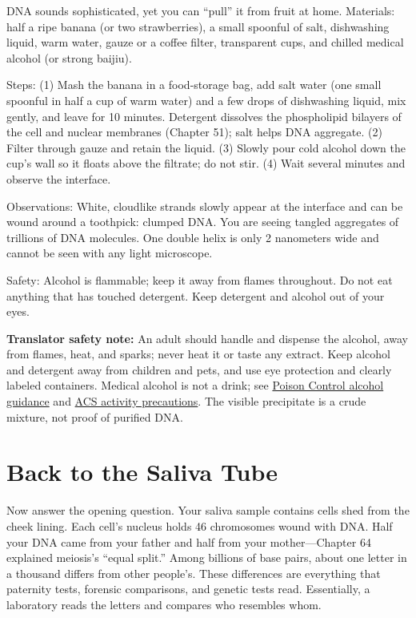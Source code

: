 \begin{shiyan}
DNA sounds sophisticated, yet you can ``pull'' it from fruit at home. Materials: half a ripe banana (or two strawberries), a small spoonful of salt, dishwashing liquid, warm water, gauze or a coffee filter, transparent cups, and chilled medical alcohol (or strong baijiu).

Steps: (1) Mash the banana in a food-storage bag, add salt water (one small spoonful in half a cup of warm water) and a few drops of dishwashing liquid, mix gently, and leave for 10 minutes. Detergent dissolves the phospholipid bilayers of the cell and nuclear membranes (Chapter 51); salt helps DNA aggregate. (2) Filter through gauze and retain the liquid. (3) Slowly pour cold alcohol down the cup's wall so it floats above the filtrate; do not stir. (4) Wait several minutes and observe the interface.

Observations: White, cloudlike strands slowly appear at the interface and can be wound around a toothpick: clumped DNA. You are seeing tangled aggregates of trillions of DNA molecules. One double helix is only 2 nanometers wide and cannot be seen with any light microscope.

Safety: Alcohol is flammable; keep it away from flames throughout. Do not eat anything that has touched detergent. Keep detergent and alcohol out of your eyes.
\end{shiyan}

\textbf{Translator safety note:} An adult should handle and dispense the alcohol, away from flames, heat, and sparks; never heat it or taste any extract. Keep alcohol and detergent away from children and pets, and use eye protection and clearly labeled containers. Medical alcohol is not a drink; see \href{https://www.poison.org/articles/rubbing-alcohol-only-looks-like-water}{Poison Control alcohol guidance} and \href{https://www.acs.org/education/celebrating-chemistry-editions/2024-ccew/science-safety-tips.html}{ACS activity precautions}. The visible precipitate is a crude mixture, not proof of purified DNA.

\section{Back to the Saliva Tube}

Now answer the opening question. Your saliva sample contains cells shed from the cheek lining. Each cell's nucleus holds 46 chromosomes wound with DNA. Half your DNA came from your father and half from your mother---Chapter 64 explained meiosis's ``equal split.'' Among billions of base pairs, about one letter in a thousand differs from other people's. These differences are everything that paternity tests, forensic comparisons, and genetic tests read. Essentially, a laboratory reads the letters and compares who resembles whom.

